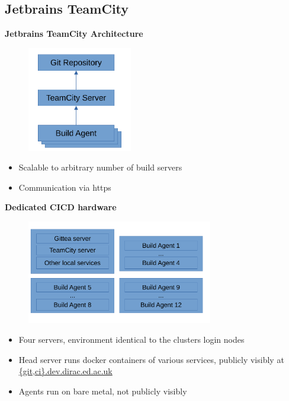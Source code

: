 \documentclass[english,xcolor=pst,11pt]{beamer}
\begin{document}
\begin{frame}

\section{Jetbrains TeamCity}
\textbf{Jetbrains TeamCity Architecture}
\begin{figure}[H]
	\centering
    {\includegraphics[width=1.8in]{diagrams/teamcity.pdf}}
\end{figure}
\vfill
\begin{itemize}
 \item Scalable to arbitrary number of build servers
 \item Communication via https
\end{itemize}




\end{frame}

\begin{frame}
\textbf{Dedicated CICD hardware}
 \begin{figure}[H]
	\centering
    {\includegraphics[width=3.2in]{diagrams/hardware.pdf}}
\end{figure}

\begin{itemize}
 \item Four servers, environment identical to the clusters login nodes
 \item Head server runs docker containers of various services, publicly visibly at \url{{git,ci}.dev.dirac.ed.ac.uk}
 \item Agents run on bare metal, not publicly visibly
\end{itemize}

\end{frame}
\end{document}
